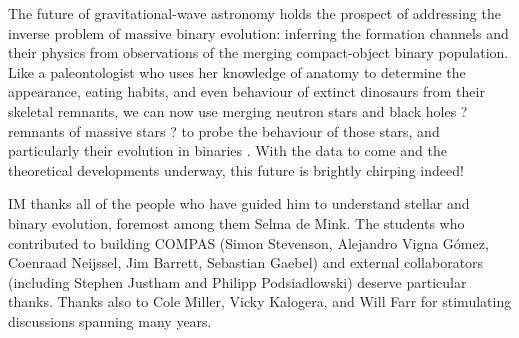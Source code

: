 \documentclass[iop,onecolumn]{revtex4}
\begin{document}
The future of gravitational-wave astronomy holds the prospect of addressing the inverse problem of massive binary evolution: inferring the formation channels and their physics from observations of the merging compact-object binary population.  Like a paleontologist who uses her knowledge of anatomy to determine the appearance, eating habits, and even behaviour of extinct dinosaurs from their skeletal remnants, we can now use merging neutron stars and black holes ? remnants of massive stars ? to probe the behaviour of those stars, and particularly their evolution in binaries \citep{MandelFarmer:2017}.   With the data to come and the theoretical developments underway, this future is brightly chirping indeed!


\begin{acknowledgements}
IM thanks all of the people who have guided him to understand stellar and binary evolution, foremost among them Selma de Mink.   The students who contributed to building COMPAS (Simon Stevenson, Alejandro Vigna G\'{o}mez, Coenraad Neijssel, Jim Barrett, Sebastian Gaebel) and external collaborators (including Stephen Justham and Philipp Podsiadlowski) deserve particular thanks.  Thanks also to Cole Miller, Vicky Kalogera, and Will Farr for stimulating discussions spanning many years.
\end{acknowledgements}



\end{document}
